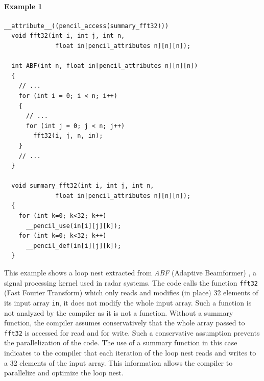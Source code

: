 \paragraph{Example 1}
  \begin{lstlisting}[language=pencil]
  __attribute__((pencil_access(summary_fft32)))
  void fft32(int i, int j, int n,
              float in[pencil_attributes n][n][n]);

  int ABF(int n, float in[pencil_attributes n][n][n])
  {
    // ...
    for (int i = 0; i < n; i++)
    {
      // ...
      for (int j = 0; j < n; j++)
        fft32(i, j, n, in);
    }
    // ...
  }

  void summary_fft32(int i, int j, int n,
              float in[pencil_attributes n][n][n]);
  {
    for (int k=0; k<32; k++)
      __pencil_use(in[i][j][k]);
    for (int k=0; k<32; k++)
      __pencil_def(in[i][j][k]);
  }
  \end{lstlisting}
  
  This example shows a loop nest extracted from
  \emph{ABF} (Adaptive Beamformer) ,
  a signal processing kernel used in radar
  systems.
  The code calls the function \lstinline!fft32! (Fast Fourier Transform)
  which only reads and modifies (in place) 32 elements of its input
  array \lstinline!in!, it does not modify the whole input array.
  Such a function is not analyzed by the \pencil compiler as it is not a \pencil
  function.
  Without a summary function, the compiler assumes conservatively that the whole
  array passed to \lstinline!fft32! is accessed for read and for write.
  Such a conservative assumption prevents the parallelization of the code.
  The use of a summary function in this case indicates to the compiler that
  each iteration of the loop nest reads and writes to a 32 elements
  of the input array.
  This information allows the compiler to parallelize and optimize the loop
  nest.

  
